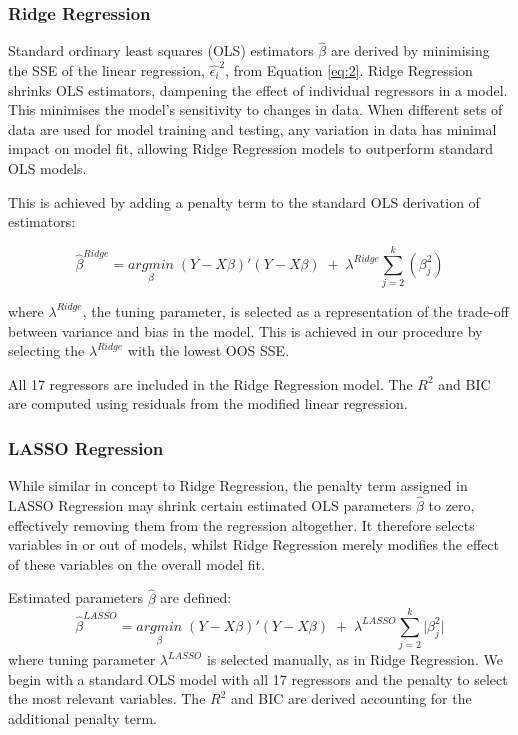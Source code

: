 \documentclass[AER]{AEA}
\begin{document}
\begin{spacing}{2}
\subsubsection{Ridge Regression}

 Standard ordinary least squares (OLS) estimators \(\hat{\beta}\) are derived by minimising the SSE of the linear regression, \(\hat{\epsilon_i}^2\), from Equation \ref{eq:2}. Ridge Regression shrinks OLS estimators, dampening the effect of individual regressors in a model. This minimises the model's sensitivity to changes in data. When different sets of data are used for model training and testing, any variation in data has minimal impact on model fit, allowing Ridge Regression models to outperform standard OLS models.

This is achieved by adding a penalty term to the standard OLS derivation of estimators:

\begin{equation}  \hat{\beta}^{Ridge}=\underset{\beta}{argmin}\;(Y-X\beta)'(Y-X\beta)\;+\;\lambda^{Ridge}\sum_{j=2}^k(\beta_j^2)
\end{equation}

where \(\lambda^{Ridge}\), the tuning parameter, is selected as a representation of the trade-off between variance and bias in the model. This is achieved in our procedure by selecting the \(\lambda^{Ridge}\) with the lowest OOS SSE.

All 17 regressors are included in the Ridge Regression model. The \(R^2\) and BIC are computed using residuals from the modified linear regression. 

\subsubsection{LASSO Regression}

While similar in concept to Ridge Regression, the penalty term assigned in LASSO Regression may shrink certain estimated OLS parameters $\hat{\beta}$ to zero, effectively removing them from the regression altogether. It therefore selects variables in or out of models, whilst Ridge Regression merely modifies the effect of these variables on the overall model fit.

Estimated parameters \(\hat{\beta}\) are defined:
\begin{equation}  \hat{\beta}^{LASSO}=\underset{\beta}{argmin}\;(Y-X\beta)'(Y-X\beta)\;+\;\lambda^{LASSO}\sum_{j=2}^k\vert\beta_j^2\vert
\end{equation}
where tuning parameter \(\lambda^{LASSO}\) is selected manually, as in Ridge Regression. We begin with a standard OLS model with all 17 regressors and the penalty to select the most relevant variables. The \(R^2\) and BIC are derived accounting for the additional penalty term.


\end{spacing}
\end{document}
